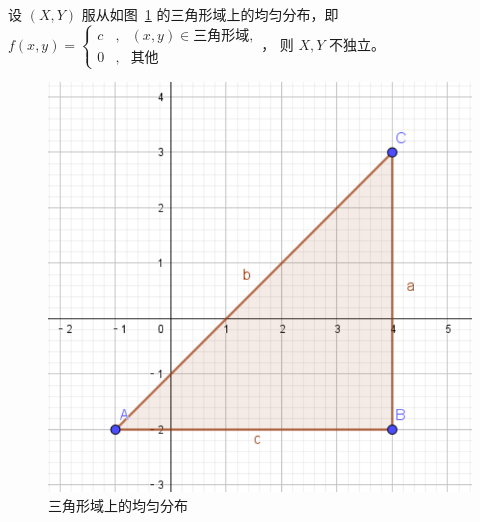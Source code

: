 \documentclass[../main.tex]{subfiles}
\begin{document}
\begin{example}
    设 $(X,Y)$ 服从如图~\ref{fig:3.6.1} 的三角形域上的均匀分布，即 $
        f(x,y)=\left\{
        \begin{aligned}
            c & , & (x,y)\in\text{三角形域}, \\
            0 & , & \text{其他}
        \end{aligned}
        \right.
    $，
    则 $X,Y$ 不独立。

    \begin{figure}[!h]
        \centering
        \includegraphics[scale=0.4]{figures/triangle.pdf}
        \caption{三角形域上的均匀分布}
        \label{fig:3.6.1}
    \end{figure}

\end{example}
\end{document}
